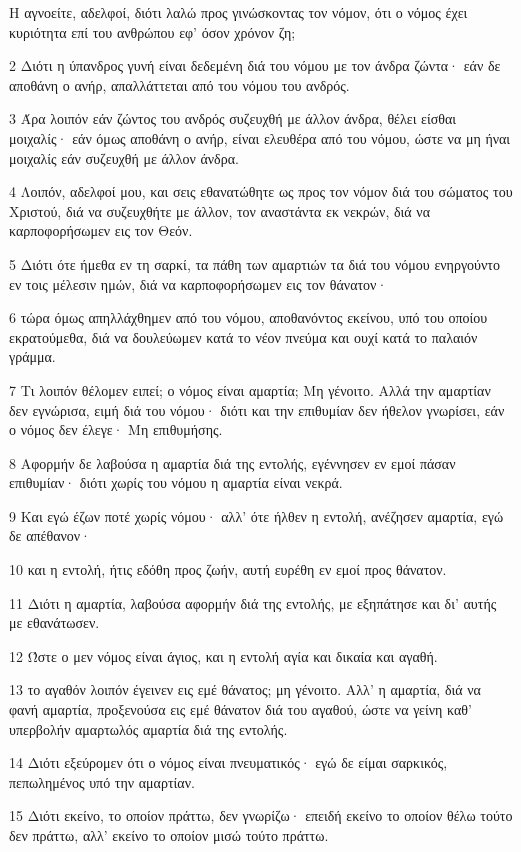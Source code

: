 \par Η αγνοείτε, αδελφοί, διότι λαλώ προς γινώσκοντας τον νόμον, ότι ο νόμος έχει κυριότητα επί του ανθρώπου εφ' όσον χρόνον ζη;
\par 2 Διότι η ύπανδρος γυνή είναι δεδεμένη διά του νόμου με τον άνδρα ζώντα· εάν δε αποθάνη ο ανήρ, απαλλάττεται από του νόμου του ανδρός.
\par 3 Άρα λοιπόν εάν ζώντος του ανδρός συζευχθή με άλλον άνδρα, θέλει είσθαι μοιχαλίς· εάν όμως αποθάνη ο ανήρ, είναι ελευθέρα από του νόμου, ώστε να μη ήναι μοιχαλίς εάν συζευχθή με άλλον άνδρα.
\par 4 Λοιπόν, αδελφοί μου, και σεις εθανατώθητε ως προς τον νόμον διά του σώματος του Χριστού, διά να συζευχθήτε με άλλον, τον αναστάντα εκ νεκρών, διά να καρποφορήσωμεν εις τον Θεόν.
\par 5 Διότι ότε ήμεθα εν τη σαρκί, τα πάθη των αμαρτιών τα διά του νόμου ενηργούντο εν τοις μέλεσιν ημών, διά να καρποφορήσωμεν εις τον θάνατον·
\par 6 τώρα όμως απηλλάχθημεν από του νόμου, αποθανόντος εκείνου, υπό του οποίου εκρατούμεθα, διά να δουλεύωμεν κατά το νέον πνεύμα και ουχί κατά το παλαιόν γράμμα.
\par 7 Τι λοιπόν θέλομεν ειπεί; ο νόμος είναι αμαρτία; Μη γένοιτο. Αλλά την αμαρτίαν δεν εγνώρισα, ειμή διά του νόμου· διότι και την επιθυμίαν δεν ήθελον γνωρίσει, εάν ο νόμος δεν έλεγε· Μη επιθυμήσης.
\par 8 Αφορμήν δε λαβούσα η αμαρτία διά της εντολής, εγέννησεν εν εμοί πάσαν επιθυμίαν· διότι χωρίς του νόμου η αμαρτία είναι νεκρά.
\par 9 Και εγώ έζων ποτέ χωρίς νόμου· αλλ' ότε ήλθεν η εντολή, ανέζησεν αμαρτία, εγώ δε απέθανον·
\par 10 και η εντολή, ήτις εδόθη προς ζωήν, αυτή ευρέθη εν εμοί προς θάνατον.
\par 11 Διότι η αμαρτία, λαβούσα αφορμήν διά της εντολής, με εξηπάτησε και δι' αυτής με εθανάτωσεν.
\par 12 Ώστε ο μεν νόμος είναι άγιος, και η εντολή αγία και δικαία και αγαθή.
\par 13 το αγαθόν λοιπόν έγεινεν εις εμέ θάνατος; μη γένοιτο. Αλλ' η αμαρτία, διά να φανή αμαρτία, προξενούσα εις εμέ θάνατον διά του αγαθού, ώστε να γείνη καθ' υπερβολήν αμαρτωλός αμαρτία διά της εντολής.
\par 14 Διότι εξεύρομεν ότι ο νόμος είναι πνευματικός· εγώ δε είμαι σαρκικός, πεπωλημένος υπό την αμαρτίαν.
\par 15 Διότι εκείνο, το οποίον πράττω, δεν γνωρίζω· επειδή εκείνο το οποίον θέλω τούτο δεν πράττω, αλλ' εκείνο το οποίον μισώ τούτο πράττω.

